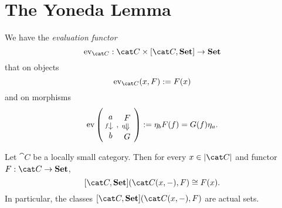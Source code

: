 
\section{The Yoneda Lemma}


We have the {\em evaluation functor}
\[\ev_{\cat C} : \cat C \times [\cat C, \Set] \to \Set\]
that on objects
\[\ev_{\cat C}(x, F) := F(x)\]
and on morphisms
\[\ev\left(\begin{tikzcd}[row sep=small] a \ar["f", d, swap] \\ b \end{tikzcd}, \begin{tikzcd}[row sep=small] F \ar["\eta", d, swap, Rightarrow] \\ G \end{tikzcd}\right) := \eta_b F(f) = G(f) \eta_a .\]

\begin{lemma}\label{lemma:YonedaLemmaLemma}
Let \(\cat C\) be a locally small category. Then for every \(x \in \obj{\cat C}\) and functor \(F : \cat C \to \Set\),
\[[\cat C, \Set](\cat C(x, -), F) \cong F(x) .\]
In particular, the classes \([\cat C, \Set](\cat C(x, -), F)\) are  actual sets.
\end{lemma}

